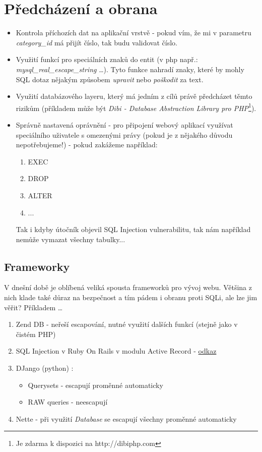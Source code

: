 \documentclass[12pt, a4paper]{report}
\begin{document}
\section{Předcházení a obrana}
\begin{itemize}
\item Kontrola příchozích dat na aplikační vrstvě - pokud vím, že mi v parametru \textit{category\_id} má přijít číslo, tak budu validovat číslo.
\item Využití funkcí pro  speciálních znaků do entit (v php např.: \textit{mysql\_real\_escape\_string} \ldots). Tyto funkce nahradí znaky, které by mohly SQL dotaz nějakým způsobem \textit{upravit} nebo \textit{poškodit} za text.
\item Využití databázového layeru, který má jedním z cílů právě předcházet těmto rizikům (příkladem může být \textit{Dibi - Database Abstraction Library pro PHP}\footnote{Je zdarma k dispozici na http://dibiphp.com}).
\item Správně nastavená oprávnění - pro připojení webový aplikací využívat speciálního uživatele s omezenými právy (pokud je z nějakého důvodu nepotřebujeme!) - pokud zakážeme například:
\begin{enumerate}
\item EXEC
\item DROP
\item ALTER
\item ...
\end{enumerate}
Tak i kdyby útočník objevil SQL Injection vulnerabilitu, tak nám například nemůže vymazat všechny tabulky...
\end{itemize}
\subsection{Frameworky}
V dnešní době je oblíbená veliká spousta frameworků pro vývoj webu. Většina z nich klade také důraz na bezpečnost a tím pádem i obranu proti SQLi, ale lze jim věřit? Příkladem \ldots

\begin{enumerate}
\item Zend DB - neřeší escapování, nutné využití dalších funkcí (stejně jako v čistém PHP)
\item SQL Injection v Ruby On Rails v modulu Active Record - \href{https://groups.google.com/forum/?fromgroups=#!topic/rubyonrails-security/dUaiOOGWL1k}{odkaz}
\item DJango (python) :
\begin{itemize}
\item Querysets - escapují proměnné automaticky
\item RAW queries - neescapují
\end{itemize}
\item Nette - při využití \textit{Database} se escapují všechny proměnné automaticky
\end{enumerate}
\end{document}
